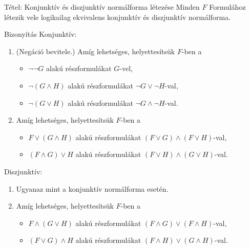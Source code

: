 \documentclass{beamer}
\begin{document}
\begin{frame}

\begin{block}{Tétel: Konjunktív és diszjunktív normálforma létezése}
Minden $F$ Formulához létezik vele logikailag ekvivalens konjunktív és diszjunktív normálforma.
\end{block}

\begin{block}{Bizonyítás}
Konjunktív:
\begin{enumerate}
	\item (Negáció bevitele.) Amíg lehetséges, helyettesítsük $F$-ben a
	\begin{itemize}
		\item $\neg \neg G$ alakú részformulákat $G$-vel,
		\item $\neg (G \land H)$ alakú részformulákat $\neg G \lor \neg H$-val,
		\item $\neg (G \lor H)$ alakú részformulákat $\neg G \land \neg H$-val.
	\end{itemize}
	\item Amíg lehetséges, helyettesítsük $F$-ben a
	\begin{itemize}
		\item $F \lor (G \land H)$ alakú részformulákat $(F \lor G) \land (F \lor H)$-val,
		\item $(F \land G) \lor H$ alakú részformulákat $(F \lor H) \land (G \lor H)$-val.
	\end{itemize}
\end{enumerate}
\bigskip
Diszjunktív:
\begin{enumerate}
	\item Ugyanaz mint a konjunktív normálforma esetén.
	\item Amíg lehetséges, helyettesítsük $F$-ben a
	\begin{itemize}
		\item $F \land (G \lor H)$ alakú részformulákat $(F \land G) \lor (F \land H)$-val,
		\item $(F \lor G) \land H$ alakú részformulákat $(F \land H) \lor (G \land H)$-val.
	\end{itemize}
\end{enumerate}
\end{block}

\end{frame}
\end{document}
